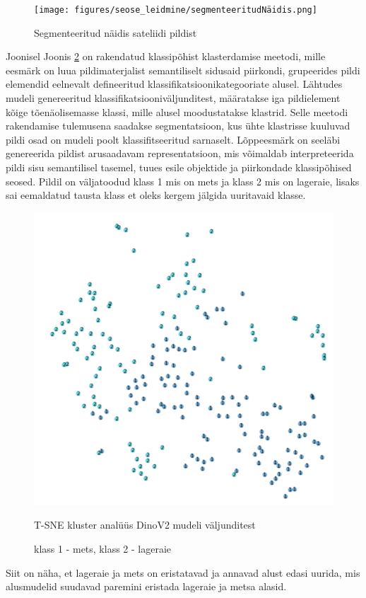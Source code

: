 \begin{figure}[H]
    \centering
    \texttt{[image: figures/seose\_leidmine/segmenteeritudNäidis.png]}
    \caption{Segmenteeritud näidis sateliidi pildist}
    \label{fig:segmenteeritudPealiskiht}
\end{figure}

Joonisel Joonis \ref{fig:tsneDinoPatchEmbedings} on rakendatud klassipõhist klasterdamise meetodi, mille eesmärk on luua
pildimaterjalist semantiliselt sidusaid piirkondi, grupeerides pildi elemendid
eelnevalt defineeritud klassifikatsioonikategooriate alusel. Lähtudes mudeli
genereeritud klassifikatsiooniväljunditest, määratakse iga pildielement kõige
tõenäolisemasse klassi, mille alusel moodustatakse klastrid. Selle meetodi
rakendamise tulemusena saadakse segmentatsioon, kus ühte klastrisse kuuluvad
pildi osad on mudeli poolt klassifitseeritud sarnaselt. Lõppeesmärk on seeläbi
genereerida pildist arusaadavam representatsioon, mis
võimaldab interpreteerida pildi sisu semantilisel tasemel, tuues
esile objektide ja piirkondade klassipõhised seosed. Pildil on väljatoodud klass 1 mis on mets ja klass 2 mis on lageraie, lisaks sai eemaldatud tausta klass et oleks kergem jälgida uuritavaid klasse.

\begin{figure}[H]
    \centering
    \includegraphics[width=.7\textwidth]{figures/seose_leidmine/tsneDinoPatchEmbedings.png}
    \caption{T-SNE kluster analüüs DinoV2 mudeli väljunditest}
    \caption*{klass 1 - mets, klass 2 - lageraie}
    \label{fig:tsneDinoPatchEmbedings}
\end{figure}

Siit on näha, et lageraie ja mets on eristatavad ja annavad alust edasi uurida, mis alusmudelid suudavad paremini eristada lageraie ja metsa alasid.